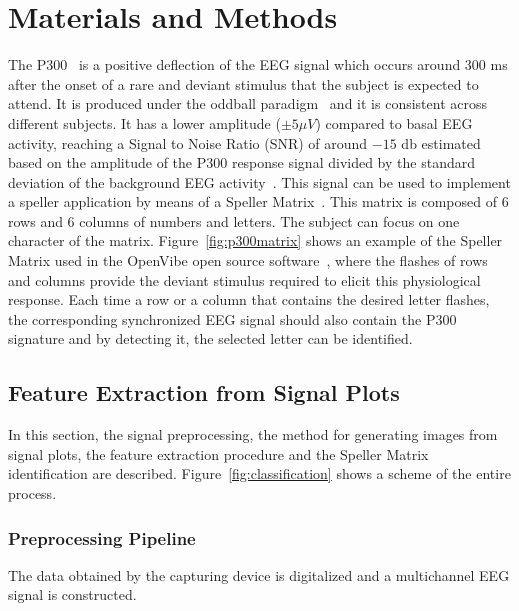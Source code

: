 \documentclass[utf8]{frontiersSCNS} %
\begin{document}
\section{Materials and Methods}

The P300~\citep{Farwell1988,Knuth2006} is a positive deflection of the EEG signal which occurs around $300$ ms after the onset of a rare and deviant stimulus that the subject is expected to attend.  It is produced under the oddball paradigm~\citep{WolpawJonathanR2012} and it is consistent across different subjects. It has a lower amplitude  ($\pm 5 \mu V $) compared to basal EEG activity, reaching a Signal to Noise Ratio (SNR) of around $-15$ db estimated based on the amplitude of the P300 response signal divided by the standard deviation of the background EEG activity~\citep{Hu2010}.  This signal can be used to implement a speller application by means of a Speller Matrix~\citep{Farwell1988}. This matrix is composed of 6 rows and 6 columns of numbers and letters. The subject can focus on one character of the matrix. Figure~\ref{fig:p300matrix} shows an example of the Speller Matrix used in the OpenVibe open source software~\citep{Renard2010}, where the flashes of rows and columns provide the deviant stimulus required to elicit this physiological response.   Each time a row or a column that contains the desired letter flashes, the corresponding synchronized EEG signal should also contain the P300 signature and by detecting it, the selected letter can be identified.

\subsection{Feature Extraction from Signal Plots} \label{Feature}

In this section, the signal preprocessing, the method for generating images from signal plots, the feature extraction procedure and the Speller Matrix identification are described.  Figure~\ref{fig:classification} shows a scheme of the entire process.

\subsubsection{Preprocessing Pipeline} \label{Pipeline}

The data obtained by the capturing device is digitalized and a multichannel EEG signal is constructed.

\end{document}
